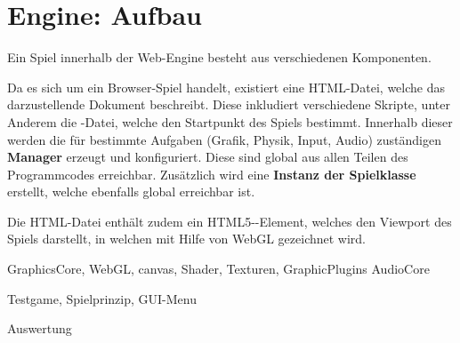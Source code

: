 \part{Engine: Aufbau}

Ein Spiel innerhalb der Web-Engine besteht aus verschiedenen Komponenten.

Da es sich um ein Browser-Spiel handelt, existiert eine HTML-Datei, welche das darzustellende Dokument beschreibt. Diese inkludiert verschiedene Skripte, unter Anderem die -Datei, welche den Startpunkt des Spiels bestimmt. Innerhalb dieser werden die für bestimmte Aufgaben (Grafik, Physik, Input, Audio) zuständigen \textbf{Manager} erzeugt und konfiguriert. Diese sind global aus allen Teilen des Programmcodes erreichbar. Zusätzlich wird eine \textbf{Instanz der Spielklasse} erstellt, welche ebenfalls global erreichbar ist.

Die HTML-Datei enthält zudem ein HTML5--Element, welches den Viewport des Spiels darstellt, in welchen mit Hilfe von WebGL gezeichnet wird.












GraphicsCore, WebGL, canvas, Shader, Texturen, GraphicPlugins
AudioCore

Testgame, Spielprinzip, GUI-Menu

Auswertung